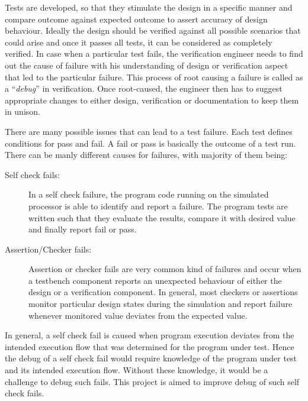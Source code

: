 Tests are developed, so that they stimulate the design in a specific manner and compare outcome against expected outcome to assert accuracy of design behaviour. Ideally the design should be verified against all possible scenarios that could arise and once it passes all tests, it can be considered as completely verified. In case when a particular test fails, the verification engineer needs to find out the cause of failure with his understanding of design or verification aspect that led to the particular failure. This process of root causing a failure is called as a ``{\it debug}'' in verification. Once root-caused, the engineer then has to suggest appropriate changes to either design, verification or documentation to keep them in unison. 

There are many possible issues that can lead to a test failure. Each test defines conditions for pass and fail. A fail or pass is basically the outcome of a test run. There can be manly different causes for failures, with majority of them being:

\begin{description}
	\item[Self check fails:] In a self check failure, the program code running on the simulated processor is able to identify and report a failure. The program tests are written such that they evaluate the results, compare it with desired value and finally report fail or pass. 
	\item[Assertion/Checker fails:] Assertion or checker fails are very common kind of failures and occur when a testbench component reports an unexpected behaviour of either the design or a verification component. In general, most checkers or assertions monitor particular design states during the simulation and report failure whenever monitored value deviates from the expected value. 
\end{description}

In general, a self check fail is caused when program execution deviates from the intended execution flow that was determined for the program under test. Hence the debug of a self check fail would require knowledge of the program under test and its intended execution flow. Without these knowledge, it would be a challenge to debug such fails. This project is aimed to improve debug of such self check fails.

%
%
%

